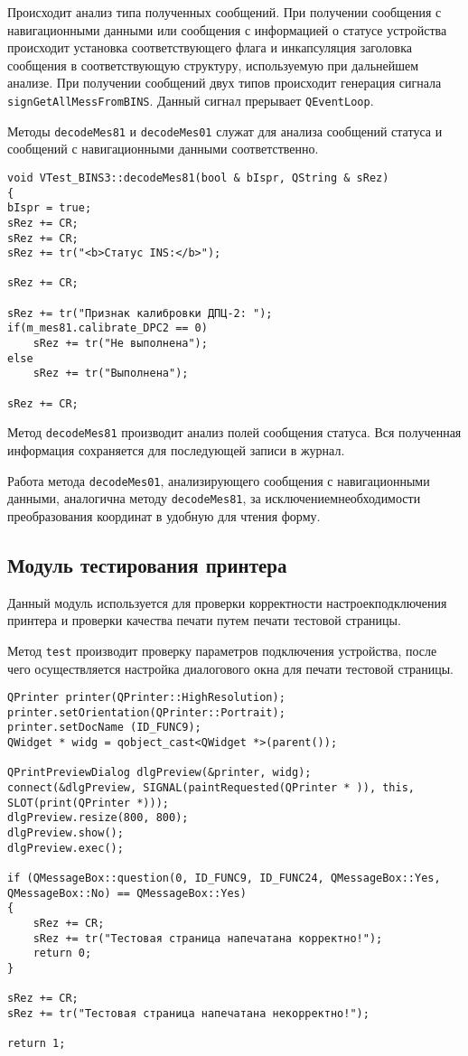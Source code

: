 Происходит анализ типа полученных сообщений. При получении сообщения с навигационными данными или сообщения с
информацией о статусе устройства происходит установка соответствующего флага и инкапсуляция заголовка сообщения в
соответствующую структуру, используемую при дальнейшем анализе. При получении сообщений двух типов происходит генерация
сигнала \texttt{signGetAllMessFromBINS}. Данный сигнал прерывает \texttt{QEventLoop}.

Методы \texttt{decodeMes81} и \texttt{decodeMes01} служат для анализа сообщений статуса и сообщений с навигационными
данными соответственно.
\medskip
\begin{verbatim}
void VTest_BINS3::decodeMes81(bool & bIspr, QString & sRez)
{
bIspr = true;
sRez += CR;
sRez += CR;
sRez += tr("<b>Статус INS:</b>");

sRez += CR;

sRez += tr("Признак калибровки ДПЦ-2: ");
if(m_mes81.calibrate_DPC2 == 0)
	sRez += tr("Не выполнена");
else
	sRez += tr("Выполнена");

sRez += CR;
\end{verbatim}
\medskip

Метод \texttt{decodeMes81} производит анализ полей сообщения статуса. Вся полученная информация сохраняется для
последующей записи в журнал.

Работа метода \texttt{decodeMes01}, анализирующего сообщения с навигационными данными, аналогична методу
\texttt{decodeMes81}, за исключением\break необходимости преобразования координат в удобную для чтения форму.

\subsection{Модуль тестирования принтера}
Данный модуль используется для проверки корректности настроек\break подключения принтера и проверки качества печати путем
печати тестовой страницы.

Метод \texttt{test} производит проверку параметров подключения устройства, после чего осуществляется настройка
диалогового окна для печати тестовой страницы.
\medskip
\begin{verbatim}
QPrinter printer(QPrinter::HighResolution);
printer.setOrientation(QPrinter::Portrait);
printer.setDocName (ID_FUNC9);
QWidget * widg = qobject_cast<QWidget *>(parent());

QPrintPreviewDialog dlgPreview(&printer, widg);
connect(&dlgPreview, SIGNAL(paintRequested(QPrinter * )), this, SLOT(print(QPrinter *)));
dlgPreview.resize(800, 800);
dlgPreview.show();
dlgPreview.exec();

if (QMessageBox::question(0, ID_FUNC9, ID_FUNC24, QMessageBox::Yes, QMessageBox::No) == QMessageBox::Yes)
{
	sRez += CR;
	sRez += tr("Тестовая страница напечатана корректно!");
	return 0;
}

sRez += CR;
sRez += tr("Тестовая страница напечатана некорректно!");

return 1;
\end{verbatim}
\medskip


